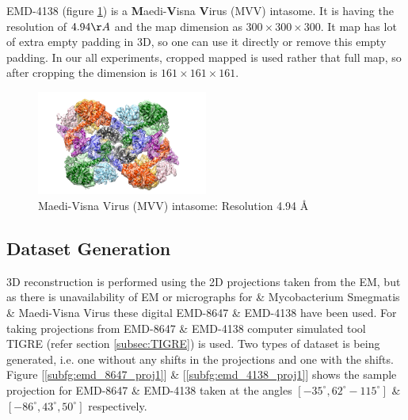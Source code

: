 \documentclass{report}
\begin{document}
EMD-4138 (figure \ref{fig:EMD-4138-3d-struct}) is a \textbf{M}aedi-\textbf{V}isna \textbf{V}irus (MVV) intasome. It is having the resolution of $4.94\AA$ and the map dimension as $300\times300\times300$. It map has lot of extra empty padding in 3D, so one can use it directly or remove this empty padding. In our all experiments, cropped mapped is used rather that full map, so after cropping the dimension is $161\times161\times161$.   

\begin{figure}[H]
\includegraphics[width=0.5\textwidth]{Emd_4138.png}
\centering
\captionsetup{justification=centering}
\caption{Maedi-Visna Virus (MVV) intasome: Resolution 4.94 \AA }
\label{fig:EMD-4138-3d-struct}
\end{figure}

\subsection{Dataset Generation}

3D reconstruction is performed using the 2D projections taken from the EM, but as there is unavailability of EM or micrographs for  \& Mycobacterium Smegmatis \& Maedi-Visna Virus these digital EMD-8647 \& EMD-4138 have been used. For taking projections from EMD-8647 \& EMD-4138 computer simulated tool TIGRE (refer section \ref{subsec:TIGRE}) is used. Two types of dataset is being generated, i.e. one without any shifts in the projections and one with the shifts. Figure [\ref{subfg:emd_8647_proj1}] \& [\ref{subfg:emd_4138_proj1}] shows the sample projection for  EMD-8647 \& EMD-4138 taken at the angles $[-35^{\circ} ,62^{\circ} -115^{\circ}]$ \& $[-86^{\circ},43^{\circ},50^{\circ}]$ respectively.
\end{document}
